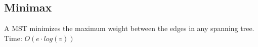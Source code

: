 \subsection{Minimax}

A MST minimizes the maximum weight between the edges in any spanning tree.
Time: $O(e \cdot log(v))$
